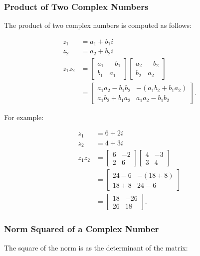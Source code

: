 \documentclass[10pt]{article}
\begin{document}
\subsubsection{Product of Two Complex Numbers}
The product of two complex numbers is computed as follows:

$$
\begin{aligned}
z_{1} & =a_{1}+b_{1} i \\
z_{2} & =a_{2}+b_{2} i \\
z_{1} z_{2} & =\left[\begin{array}{cc}
a_{1} & -b_{1} \\
b_{1} & a_{1}
\end{array}\right]\left[\begin{array}{cc}
a_{2} & -b_{2} \\
b_{2} & a_{2}
\end{array}\right] \\
& =\left[\begin{array}{cc}
a_{1} a_{2}-b_{1} b_{2} & -\left(a_{1} b_{2}+b_{1} a_{2}\right) \\
a_{1} b_{2}+b_{1} a_{2} & a_{1} a_{2}-b_{1} b_{2}
\end{array}\right] .
\end{aligned}
$$

For example:

$$
\begin{aligned}
z_{1} & =6+2 i \\
z_{2} & =4+3 i \\
z_{1} z_{2} & =\left[\begin{array}{cc}
6 & -2 \\
2 & 6
\end{array}\right]\left[\begin{array}{cc}
4 & -3 \\
3 & 4
\end{array}\right] \\
& =\left[\begin{array}{cc}
24-6 & -(18+8) \\
18+8 & 24-6
\end{array}\right] \\
& =\left[\begin{array}{cc}
18 & -26 \\
26 & 18
\end{array}\right] .
\end{aligned}
$$

\subsubsection{Norm Squared of a Complex Number}
The square of the norm is as the determinant of the matrix:
\end{document}
